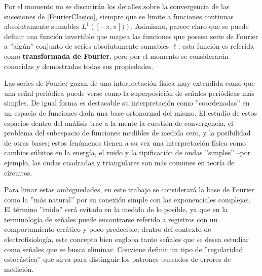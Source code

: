 
Por el momento no se discutir\'an los detalles sobre la convergencia de las sucesiones de 
\ref{FourierClasico}, siempre que se limite a funciones continuas absolutamente sumables 
$L^{1}\left([-\pi,\pi])\right)$.
Asimismo, parece claro que se puede definir una funci\'on invertible que mapea las funciones que
poseen serie de Fourier a ''alg\'un'' conjunto de series absolutamente sumables $\ell$; esta
funci\'on es referida como \textbf{transformada de Fourier}, pero por el momento se considerar\'an
conocidas y demostradas todas sus propiedades.



Las series de Fourier gozan de una interpretación física muy extendida como que una se\~nal 
peri\'odica
puede verse como la superposici\'on de se\~nales peri\'odicas m\'as simples. 
De igual forma es destacable su interpretaci\'on como ''coordenadas'' en un espacio de funciones
dada una base ortonormal del mismo. 
El estudio de estos espacios dentro del an\'alisis trae a la mente
la cuesti\'on de convergencia,
el problema del subespacio de
funciones medibles de medida cero, y la posibilidad de otras bases; estos fen\'omenos tienen a su 
vez una interpretaci\'on f\'isica como cambios s\'ubitos en la energ\'ia, el ruido y la 
tipificaci\'on de ondas ''simples'' --por ejemplo, las ondas cuadradas y triangulares son 
m\'as comunes en teor\'ia de circuitos.

Para limar estas ambig\:uedades, en este trabajo se considerar\'a la base de Fourier como la
''m\'as natural'' por su conexi\'on simple con las exponenciales complejas. El t\'ermino
''ruido'' ser\'a evitado en la medida de lo posible, ya que en la terminolog\'ia de se\~nales
puede encontrarse referido a registros con un comportamiento err\'atico y poco
predecible; dentro del contexto de electrofisiolog\'ia, este concepto bien
engloba tanto se\~nales que
se desea estudiar como se\~nales que se busca eliminar. 
Conviene definir
un tipo de ''regularidad estoc\'astica'' que sirva para distinguir los patrones buscados
de errores de medici\'on.

